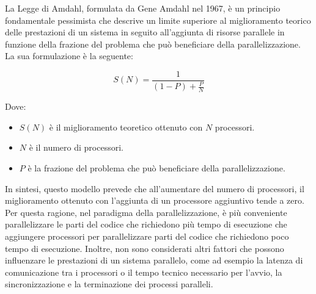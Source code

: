 La Legge di Amdahl, formulata da Gene Amdahl nel 1967, è un principio fondamentale
pessimista che descrive un limite superiore al miglioramento teorico delle prestazioni
di un sistema in seguito all'aggiunta di risorse parallele in funzione della frazione
del problema che può beneficiare della parallelizzazione. La sua formulazione è
la seguente:

\begin{equation}
  S(N) = \frac{1}{(1 - P) + \frac{P}{N}}
\end{equation}

Dove:
\begin{itemize}
  \item $S(N)$ è il miglioramento teoretico ottenuto con $N$ processori.

  \item $N$ è il numero di processori.

  \item $P$ è la frazione del problema che può beneficiare della parallelizzazione.
\end{itemize}

In sintesi, questo modello prevede che all'aumentare del numero di processori, il
miglioramento ottenuto con l'aggiunta di un processore aggiuntivo tende a zero.
Per questa ragione, nel paradigma della parallelizzazione, è più conveniente
parallelizzare le parti del codice che richiedono più tempo di esecuzione che
aggiungere processori per parallelizzare parti del codice che richiedono poco
tempo di esecuzione. Inoltre, non sono considerati altri fattori che possono
influenzare le prestazioni di un sistema parallelo, come ad esempio la latenza di
comunicazione tra i processori o il tempo tecnico necessario per l'avvio, la
sincronizzazione e la terminazione dei processi paralleli.